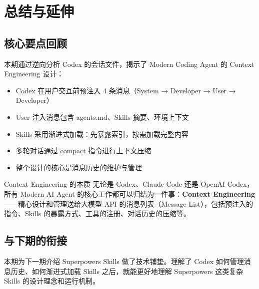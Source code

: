 \section{总结与延伸}

\subsection{核心要点回顾}

本期通过逆向分析 Codex 的会话文件，揭示了 Modern Coding Agent 的 Context Engineering 设计：

\begin{itemize}
    \item Codex 在用户交互前预注入 4 条消息（System → Developer → User → Developer）
    \item User 注入消息包含 agents.md、Skills 摘要、环境上下文
    \item Skills 采用渐进式加载：先暴露索引，按需加载完整内容
    \item 多轮对话通过 compact 指令进行上下文压缩
    \item 整个设计的核心是消息历史的维护与管理
\end{itemize}

\begin{importantbox}{Context Engineering 的本质}
无论是 Codex、Claude Code 还是 OpenAI Codex，所有 Modern AI Agent 的核心工作都可以归结为一件事：\textbf{Context Engineering}——精心设计和管理送给大模型 API 的消息列表（Message List），包括预注入的指令、Skills 的暴露方式、工具的注册、对话历史的压缩等。
\end{importantbox}

\subsection{与下期的衔接}

本期为下一期介绍 Superpowers Skills 做了技术铺垫。理解了 Codex 如何管理消息历史、如何渐进式加载 Skills 之后，就能更好地理解 Superpowers 这类复杂 Skills 的设计理念和运行机制。




